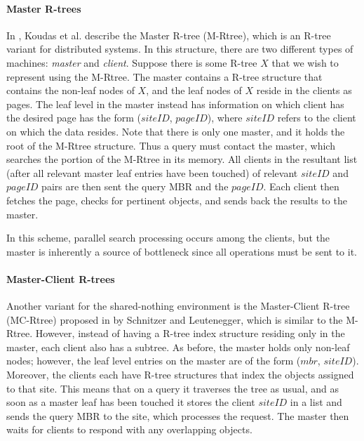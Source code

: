 \paragraph{Master R-trees}
In \cite{koudas1996declustering}, Koudas et al. describe the  Master R-tree 
(M-Rtree), which is an R-tree variant for distributed systems.
In this structure, there are two different types of machines: \emph{master} and 
\emph{client}. Suppose there is some R-tree $X$ that we wish to represent using 
the M-Rtree. The master contains a R-tree structure that contains the non-leaf 
nodes of $X$, and the leaf nodes of $X$ reside in the clients as pages. The leaf 
level in the master instead has information on which client has the desired page 
has the form ($siteID$, $pageID$), where $siteID$ refers to the client on which
the data resides. Note that there is only one master, and it holds the root of 
the M-Rtree structure.
Thus a query must contact the master, which searches the portion of the M-Rtree 
in its memory. All clients in the resultant list (after all relevant master leaf 
entries have been touched) of relevant $siteID$ and $pageID$ pairs are then sent 
the query MBR and the $pageID$. Each client then fetches the page, checks for 
pertinent objects, and sends back the results to the master. 

In this scheme, parallel search processing occurs among the clients, but the 
master is inherently a source of bottleneck since all operations must be sent to
it.

\paragraph{Master-Client R-trees}
Another variant for the shared-nothing environment is the Master-Client R-tree 
(MC-Rtree) proposed in \cite{schnitzer1999master} by Schnitzer and Leutenegger,  
which is similar to the 
M-Rtree. However, instead of having a R-tree index 
structure residing only in the master, each client also has a subtree. As before,
the master holds only non-leaf nodes; however, the leaf level entries on the 
master are of the form ($mbr$, $\mathit{siteID}$). Moreover, the clients each have R-tree %
structures that index the objects assigned to that site. This means that on a 
query it traverses the tree as usual, and as soon as a master leaf has been 
touched it stores the client $\mathit{siteID}$ in a list and sends the query MBR to the 
site, which processes the request. The master then waits for clients to respond
with any overlapping objects. 

